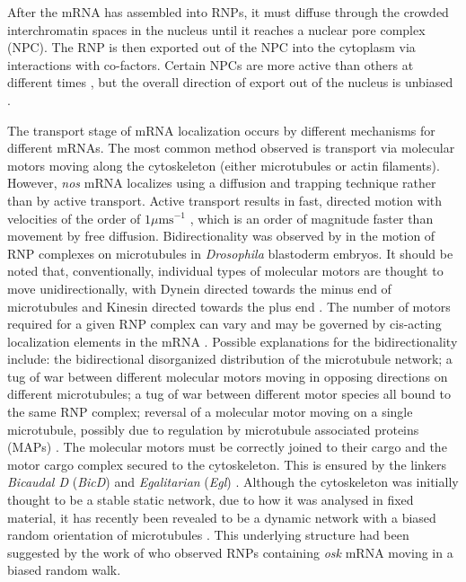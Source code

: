 \documentclass[twocolumn]{biophys}
\begin{document}
After the mRNA has assembled into RNPs, it must diffuse through the crowded interchromatin spaces in the nucleus until it reaches a nuclear pore complex (NPC).
The RNP is then exported out of the NPC into the cytoplasm via interactions with co-factors.
Certain NPCs are more active than others at different times \citep{weil2012drosophila}, but the overall direction of export out of the nucleus is unbiased \citep{wilkie2001drosophila}. 

The transport stage of mRNA localization occurs by different mechanisms for different mRNAs.
The most common method observed is transport via molecular motors moving along the cytoskeleton (either microtubules or actin filaments). 
However, \textit{nos} mRNA localizes using a diffusion and trapping technique \citep{forrest2003live} rather than by active transport. 
Active transport results in fast, directed motion with velocities of the order of $1 \mu \text{m} \text{s}^{-1}$ \citep{weil2006localization, zimyanin2008vivo, DavidsonPhD2015}, which is an order of magnitude faster than movement by free diffusion.
Bidirectionality was observed by \citet{vendra2007dynactin} in the motion of RNP complexes on microtubules in \textit{Drosophila} blastoderm embryos.
It should be noted that, conventionally, individual types of molecular motors are thought to move unidirectionally, with Dynein directed towards the minus end of microtubules and Kinesin directed towards the plus end \citep{howard2001mechanics}.
The number of motors required for a given RNP complex can vary and may be governed by cis-acting localization elements in the mRNA \citep{amrute2012single}.
Possible explanations for the bidirectionality include: the bidirectional disorganized distribution of the microtubule network; a tug of war between different molecular motors moving in opposing directions on different microtubules; a tug of war between different motor species all bound to the same RNP complex; reversal of a molecular motor moving on a single microtubule, possibly due to regulation by microtubule associated proteins (MAPs) \citep{buxbaum2015right}. 
The molecular motors must be correctly joined to their cargo and the motor cargo complex secured to the cytoskeleton.
This is ensured by the linkers \textit{Bicaudal D} (\textit{BicD}) and \textit{Egalitarian} (\textit{Egl}) \citep{parton2014subcellular}. 
Although the cytoskeleton was initially thought to be a stable static network, due to how it was analysed in fixed material, it has recently been revealed to be a dynamic network with a biased random orientation of microtubules \citep{parton20111}.
This underlying structure had been suggested by the work of \citet{zimyanin2008vivo} who observed RNPs containing \textit{osk} mRNA moving in a biased random walk.  
\end{document}
